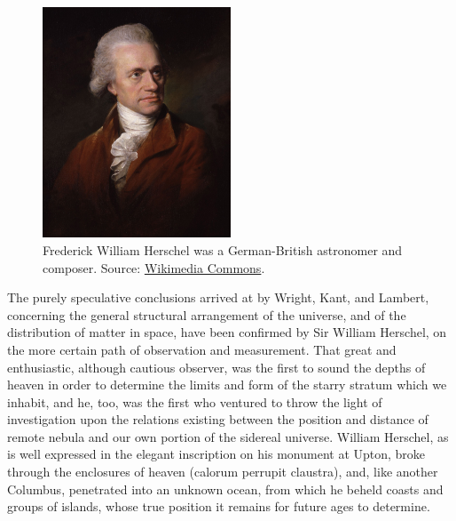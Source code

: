 \clearpage
\begin{figure}
   \centering
   \includegraphics[width=0.5\textwidth]{../../pictures/William_Herschel01.jpg}
   \captionsetup{width=0.5\textwidth}
   \caption{\footnotesize Frederick William Herschel was a German-British astronomer and composer. Source: \href{https://commons.wikimedia.org/wiki/File:William_Herschel01.jpg}{Wikimedia Commons}.}
   \vspace{-16pt}
\end{figure}

The purely speculative conclusions arrived at by Wright, Kant, and Lambert, concerning the general structural arrangement of the universe, and of the distribution of matter in space, have been confirmed by Sir William Herschel, on the more certain path of observation and measurement. That great and enthusiastic, although cautious observer, was the first to sound the depths of heaven in order to determine the limits and form of the starry stratum which we inhabit, and he, too, was the first who ventured to throw the light of investigation upon the relations existing between the position and distance of remote nebula and our own portion of the sidereal universe. William Herschel, as is well expressed in the elegant inscription on his monument at Upton, broke through the enclosures of heaven (calorum perrupit claustra), and, like another Columbus, penetrated into an unknown ocean, from which he beheld coasts and groups of islands, whose true position it remains for future ages to determine.


